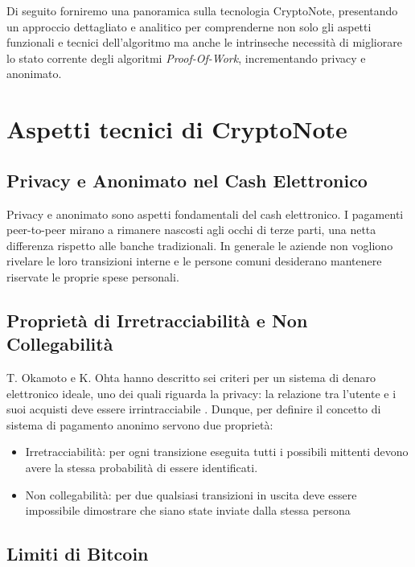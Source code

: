 Di seguito forniremo una panoramica sulla tecnologia CryptoNote,
presentando un approccio dettagliato e analitico per comprenderne non
solo gli aspetti funzionali e tecnici dell'algoritmo ma anche le
intrinseche necessità di migliorare lo stato corrente degli algoritmi
\emph{Proof-Of-Work}, incrementando privacy e anonimato.

\section{Aspetti tecnici di
CryptoNote}\label{aspetti-tecnici-di-cryptonote}

\subsection{Privacy e Anonimato nel Cash
Elettronico}\label{privacy-e-anonimato-nel-cash-elettronico}

Privacy e anonimato sono aspetti fondamentali del cash elettronico. I
pagamenti peer-to-peer mirano a rimanere nascosti agli occhi di terze
parti, una netta differenza rispetto alle banche tradizionali. In
generale le aziende non vogliono rivelare le loro transizioni interne e
le persone comuni desiderano mantenere riservate le proprie spese
personali.

\subsection{Proprietà di Irretracciabilità e Non
Collegabilità}\label{proprieta-di-irretracciabilita-e-non-collegabilita}

T. Okamoto e K. Ohta hanno descritto sei criteri per un sistema di
denaro elettronico ideale, uno dei quali riguarda la privacy: la
relazione tra l'utente e i suoi acquisti deve essere irrintracciabile
\cite{okamoto1991universal}. Dunque, per definire il concetto di sistema di pagamento
anonimo servono due proprietà:

\begin{itemize}
\item
  Irretracciabilità: per ogni transizione eseguita tutti i possibili
  mittenti devono avere la stessa probabilità di essere identificati.
\item
  Non collegabilità: per due qualsiasi transizioni in uscita deve essere
  impossibile dimostrare che siano state inviate dalla stessa persona
\end{itemize}

\subsection{Limiti di Bitcoin}\label{limiti-di-bitcoin}

